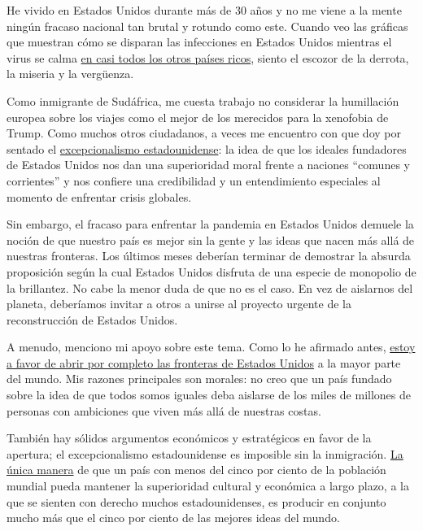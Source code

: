 He vivido en Estados Unidos durante más de 30 años y no me viene a la
mente ningún fracaso nacional tan brutal y rotundo como este. Cuando veo
las gráficas que muestran cómo se disparan las infecciones en Estados
Unidos mientras el virus se calma
\href{https://www.nytimes.com/2020/06/29/briefing/coronavirus-mississippi-new-england-patriots-your-monday-briefing.html}{en
casi todos los otros países ricos}, siento el escozor de la derrota, la
miseria y la vergüenza.

Como inmigrante de Sudáfrica, me cuesta trabajo no considerar la
humillación europea sobre los viajes como el mejor de los merecidos para
la xenofobia de Trump. Como muchos otros ciudadanos, a veces me
encuentro con que doy por sentado el
\href{https://theweek.com/articles/654508/what-exactly-american-exceptionalism}{excepcionalismo
estadounidense}: la idea de que los ideales fundadores de Estados Unidos
nos dan una superioridad moral frente a naciones ``comunes y
corrientes'' y nos confiere una credibilidad y un entendimiento
especiales al momento de enfrentar crisis globales.

Sin embargo, el fracaso para enfrentar la pandemia en Estados Unidos
demuele la noción de que nuestro país es mejor sin la gente y las ideas
que nacen más allá de nuestras fronteras. Los últimos meses deberían
terminar de demostrar la absurda proposición según la cual Estados
Unidos disfruta de una especie de monopolio de la brillantez. No cabe la
menor duda de que no es el caso. En vez de aislarnos del planeta,
deberíamos invitar a otros a unirse al proyecto urgente de la
reconstrucción de Estados Unidos.

A menudo, menciono mi apoyo sobre este tema. Como lo he afirmado antes,
\href{https://www.nytimes.com/es/2019/01/22/espanol/opinion/fronteras-abiertas-muro-fronterizo.html}{estoy
a favor de abrir por completo las fronteras de Estados Unidos} a la
mayor parte del mundo. Mis razones principales son morales: no creo que
un país fundado sobre la idea de que todos somos iguales deba aislarse
de los miles de millones de personas con ambiciones que viven más allá
de nuestras costas.

También hay sólidos argumentos económicos y estratégicos en favor de la
apertura; el excepcionalismo estadounidense es imposible sin la
inmigración. \href{http://paulgraham.com/95.html}{La única manera} de
que un país con menos del cinco por ciento de la población mundial pueda
mantener la superioridad cultural y económica a largo plazo, a la que se
sienten con derecho muchos estadounidenses, es producir en conjunto
mucho más que el cinco por ciento de las mejores ideas del mundo.

